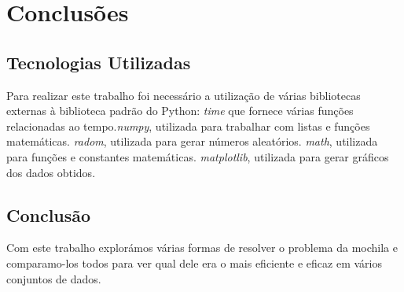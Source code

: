 \chapter{Conclusões}
\label{chap:tecno-ferra}

\section{Tecnologias Utilizadas}
\label{chap3:sec:intro}
Para realizar este trabalho foi necessário a utilização de várias bibliotecas externas à biblioteca padrão do Python: \textit{time} que fornece várias funções relacionadas ao tempo.\textit{numpy}, utilizada para trabalhar com listas e funções matemáticas. \textit{radom}, utilizada para gerar números aleatórios. \textit{math}, utilizada para funções e constantes matemáticas. \textit{matplotlib}, utilizada para gerar gráficos dos dados obtidos.

\section{Conclusão}
\label{chap3:sec:concs}
Com este trabalho explorámos várias formas de resolver o problema da mochila e comparamo-los todos para ver qual dele era o mais eficiente e eficaz em vários conjuntos de dados.